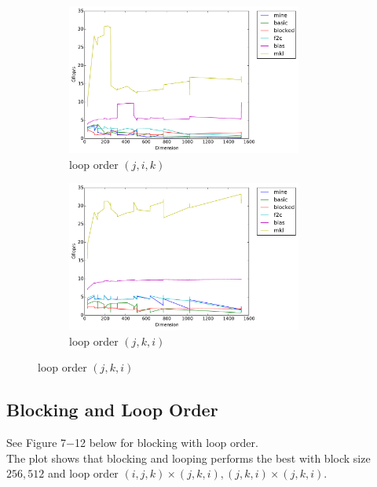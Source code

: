\documentclass[12pt]{article}
\numberwithin{equation}{section}
\begin{document}
\begin{figure}[!ht]
   \begin{subfigure}
      \centering
        \begin{center}
      \includegraphics[width=0.85\textwidth] {jik}
        \end{center}
      \label{aload0}
      \caption{loop order $(j, i, k)$}
  \end{subfigure}
  \begin{subfigure}
      \centering
        \begin{center}
      \includegraphics[width=0.85\textwidth] {jki}
        \end{center}
      \label{aload1}
      \caption{loop order $(j, k, i)$}
  \end{subfigure}

\end{figure}

\subsection{Blocking and Loop Order}

See Figure 7$-$12 below for blocking with loop order.
\\
The plot shows that blocking and looping performs the best with block size $256, 512$ and loop order $(i, j, k)\times(j, k, i), (j, k, i)\times(j, k, i)$.
\end{document}
